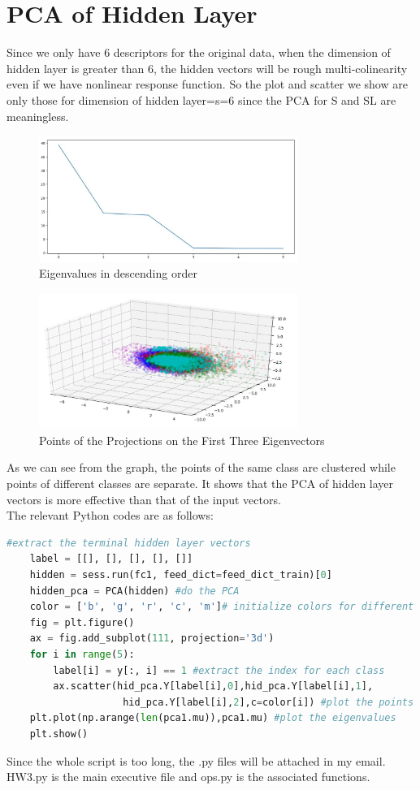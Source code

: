 \documentclass{article}
\begin{document}
\section{PCA of Hidden Layer}
Since we only have 6 descriptors for the original data, when the dimension of hidden layer is greater than 6, the hidden vectors will be rough multi-colinearity even if we have nonlinear response function. So the plot and scatter we show are only those for dimension of hidden layer=s=6 since the PCA for S and SL are meaningless.
  \begin{figure}[H]
  \centering
  \includegraphics[width=0.75\textwidth]{Eig.jpg}
  \caption{Eigenvalues in descending order}\label{}
  \end{figure}
  \begin{figure}[H]
  \centering
  \includegraphics[width=0.75\textwidth]{Scatter.jpg}
  \caption{Points of the Projections on the First Three Eigenvectors}\label{}
  \end{figure}
As we can see from the graph, the points of the same class are clustered while points of different classes are separate. It shows that the PCA of hidden layer vectors is more effective than that of the input vectors.\\
The relevant Python codes are as follows:
\begin{lstlisting}[language=Python]
    #extract the terminal hidden layer vectors
    label = [[], [], [], [], []]
    hidden = sess.run(fc1, feed_dict=feed_dict_train)[0]
    hidden_pca = PCA(hidden) #do the PCA
    color = ['b', 'g', 'r', 'c', 'm']# initialize colors for different classes
    fig = plt.figure()
    ax = fig.add_subplot(111, projection='3d')
    for i in range(5):
        label[i] = y[:, i] == 1 #extract the index for each class
        ax.scatter(hid_pca.Y[label[i],0],hid_pca.Y[label[i],1],
                    hid_pca.Y[label[i],2],c=color[i]) #plot the points
    plt.plot(np.arange(len(pca1.mu)),pca1.mu) #plot the eigenvalues
    plt.show()
\end{lstlisting}
Since the whole script is too long, the .py files will be attached in my email. HW3.py is the main executive file and ops.py is the associated functions.
\end{document}
